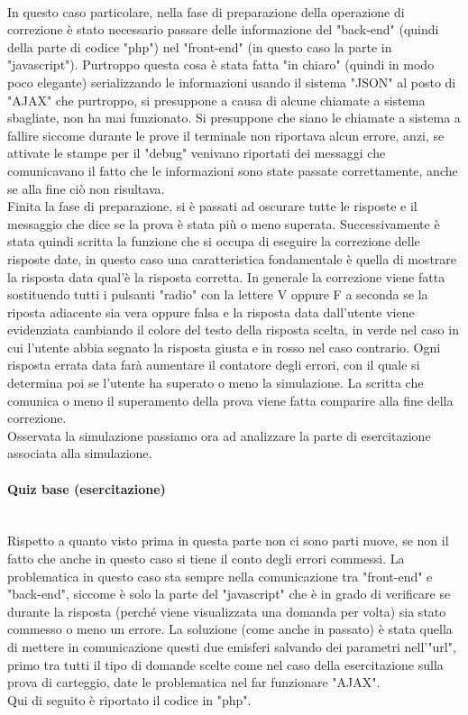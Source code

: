 \leavevmode\\
In questo caso particolare, nella fase di preparazione della operazione di correzione è stato necessario passare delle informazione del "back-end" (quindi della parte di codice "php") nel "front-end" (in questo caso la parte in "javascript"). Purtroppo questa cosa è stata fatta "in chiaro" (quindi in modo poco elegante) serializzando le informazioni usando il sistema "JSON" al posto di "AJAX" che purtroppo, si presuppone a causa di alcune chiamate a sistema sbagliate, non ha mai funzionato. Si presuppone che siano le chiamate a sistema a fallire siccome durante le prove il terminale non riportava alcun errore, anzi, se attivate le stampe per il "debug" venivano riportati dei messaggi che comunicavano il fatto che le informazioni sono state passate correttamente, anche se alla fine ciò non risultava.\\
Finita la fase di preparazione, si è passati ad oscurare tutte le risposte e il messaggio che dice se la prova è stata più o meno superata. Successivamente è stata quindi scritta la funzione che si occupa di eseguire la correzione delle risposte date, in questo caso una caratteristica fondamentale è quella di mostrare la risposta data qual'è la risposta corretta. In generale la correzione viene fatta sostituendo tutti i pulsanti "radio" con la lettere V oppure F a seconda se la riposta adiacente sia vera oppure falsa e la risposta data dall'utente viene evidenziata cambiando il colore del testo della risposta scelta, in verde nel caso in cui l'utente abbia segnato la risposta giusta e in rosso nel caso contrario. Ogni risposta errata data farà aumentare il contatore degli errori, con il quale si determina poi se l'utente ha superato o meno la simulazione. La scritta che comunica o meno il superamento della prova viene fatta comparire alla fine della correzione.\\

Osservata la simulazione passiamo ora ad analizzare la parte di esercitazione associata alla simulazione.\\

\paragraph{Quiz base (esercitazione)}\leavevmode\\
Rispetto a quanto visto prima in questa parte non ci sono parti nuove, se non il fatto che anche in questo caso si tiene il conto degli errori commessi. La problematica in questo caso sta sempre nella comunicazione tra "front-end" e "back-end", siccome è solo la parte del "javascript" che è in grado di verificare se durante la risposta (perché viene visualizzata una domanda per volta) sia stato commesso o meno un errore. La soluzione (come anche in passato) è stata quella di mettere in comunicazione questi due emisferi salvando dei parametri nell'"url", primo tra tutti il tipo di domande scelte come nel caso della esercitazione sulla prova di carteggio, date le problematica nel far funzionare "AJAX".\\
Qui di seguito è riportato il codice in "php".\\

